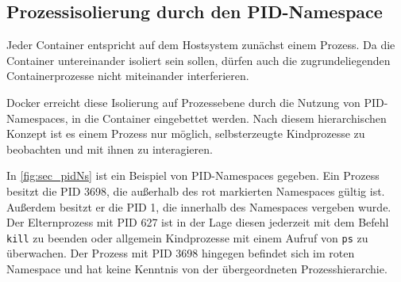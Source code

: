 \documentclass[../main.tex]{subfiles}
\begin{document}

		\subsection{Prozessisolierung durch den \acrshort{PID}-Namespace}
		\label{secIsoProcesses}

			Jeder Container entspricht auf dem Hostsystem zunächst einem Prozess. Da die Container untereinander isoliert sein sollen, dürfen auch die zugrundeliegenden Containerprozesse nicht miteinander interferieren.

			Docker erreicht diese Isolierung auf Prozessebene durch die Nutzung von PID-Namespaces, in die Container eingebettet werden. Nach diesem hierarchischen Konzept ist es einem Prozess nur möglich, selbsterzeugte Kindprozesse zu beobachten und mit ihnen zu interagieren.

			In \fig \ref{fig:sec_pidNs} ist ein Beispiel von PID-Namespaces gegeben. Ein Prozess besitzt die PID 3698, die außerhalb des rot markierten Namespaces gültig ist. Außerdem besitzt er die PID 1, die innerhalb des Namespaces vergeben wurde. Der Elternprozess mit PID 627 ist in der Lage diesen jederzeit mit dem Befehl \texttt{kill} zu beenden oder allgemein Kindprozesse mit einem Aufruf von \texttt{ps} zu überwachen. Der Prozess mit PID 3698 hingegen befindet sich im roten Namespace und hat keine Kenntnis von der übergeordneten Prozesshierarchie.

\end{document}
